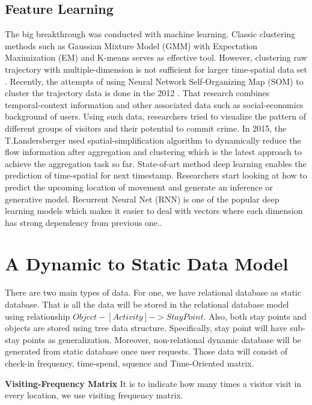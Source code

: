\documentclass[runningheads,a4paper]{llncs}
\begin{document}
\subsection{Feature Learning}
The big breakthrough was conducted with machine learning. Classic clustering methods such as Gaussian Mixture Model (GMM) with Expectation Maximization (EM) and K-means serves as effective tool. However, clustering raw trajectory with multiple-dimension is not sufficient for larger time-spatial data set  \cite{von2016mobilitygraphs}. Recently, the attempts of using Neural Network Self-Organizing Map (SOM)  \cite{kohonen1998self} to cluster the trajectory data is done in the 2012  \cite{shukla2012self}. That research combines temporal-context information and other associated data such as social-economics background of users. Using such data, researchers tried to visualize the pattern of different groups of visitors and their potential to commit crime. In 2015, the T.Landersberger used spatial-simplification algorithm  \cite{von2016mobilitygraphs} to dynamically reduce the flow information after aggregation and clustering which is the latest approach to achieve the aggregation task so far. State-of-art method deep learning enables the prediction of time-spatial for next timestamp. Researchers start looking at how to predict the upcoming location of movement  \cite{liu2016predicting} and generate an inference or generative model. Recurrent Neural Net (RNN)  \cite{medsker2001recurrent} is one of the popular deep learning models which makes it easier to deal with vectors where each dimension has strong dependency from previous one.\cite{liu2016predicting}. 

\section{A Dynamic to Static Data Model}
There are two main types of data. For one, we have relational database as static database. That is all the data will be stored in the relational database model using relationship $Object - [Activity] -> StayPoint$. Also, both stay points and objects are stored using tree data structure. Specifically, stay point will have sub-stay points as generalization. Moreover, non-relational dynamic database will be generated from static database once user requests. Those data will consist of check-in frequency, time-spend, squence and Time-Oriented matrix.

\textbf{Visiting-Frequency Matrix} It is to indicate how many times a visitor visit in every location, we use visiting frequency matrix. 
\end{document}
